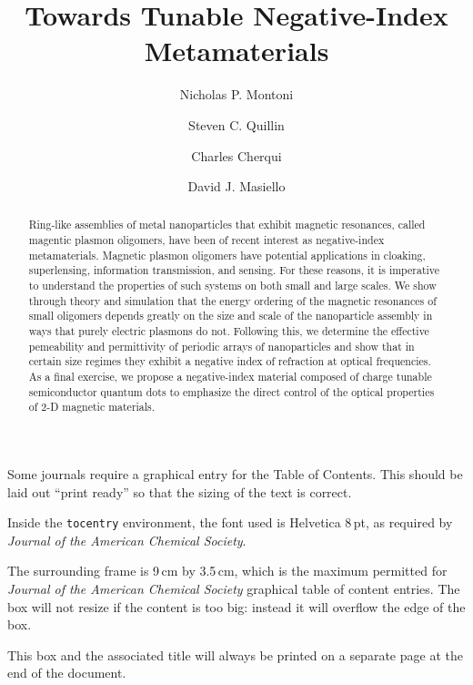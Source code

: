 \documentclass[journal=apchd5,manuscript=article]{achemso}
\author{Nicholas P. Montoni}
\author{Steven C. Quillin}
\author{Charles Cherqui}
\affiliation[Department of Chemistry, University of Washington]
{Department of Chemistry, University of Washington, Seattle, WA 98195}
\author{David J. Masiello}
\affiliation[Department of Chemistry, University of Washington]
{Department of Chemistry, University of Washington, Seattle, WA 98195}
\title[]
    {Towards Tunable Negative-Index Metamaterials}
\begin{document}
\begin{tocentry}

Some journals require a graphical entry for the Table of Contents.
This should be laid out ``print ready'' so that the sizing of the
text is correct.

Inside the \texttt{tocentry} environment, the font used is Helvetica
8\,pt, as required by \emph{Journal of the American Chemical
Society}.

The surrounding frame is 9\,cm by 3.5\,cm, which is the maximum
permitted for  \emph{Journal of the American Chemical Society}
graphical table of content entries. The box will not resize if the
content is too big: instead it will overflow the edge of the box.

This box and the associated title will always be printed on a
separate page at the end of the document.

\end{tocentry}

\begin{abstract}
Ring-like assemblies of metal nanoparticles that exhibit magnetic resonances, called magentic plasmon oligomers, have been of recent interest as negative-index metamaterials. Magnetic plasmon oligomers have potential applications in cloaking, superlensing, information transmission, and sensing. For these reasons, it is imperative to understand the properties of such systems on both small and large scales. We show through theory and simulation that the energy ordering of the magnetic resonances of small oligomers depends greatly on the size and scale of the nanoparticle assembly in ways that purely electric plasmons do not. Following this, we determine the effective pemeability and permittivity of periodic arrays of nanoparticles and show that in certain size regimes they exhibit a negative index of refraction at optical frequencies. As a final exercise, we propose a negative-index material composed of charge tunable semiconductor quantum dots to emphasize the direct control of the optical properties of 2-D magnetic materials.
\end{abstract}
\end{document}
